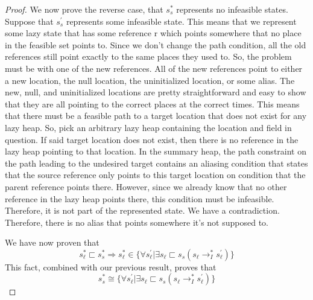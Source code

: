 \begin{proof}
We now prove the reverse case, that $s_s^*$ represents no infeasible states. Suppose that $s_s^\prime$ represents some infeasible state. This means that we represent some lazy state that has some reference r which points somewhere that no place in the feasible set points to. Since we don't change the path condition, all the old references still point exactly to the same places they used to. So, the problem must be with one of the new references. All of the new references point to either a new location, the null location, the uninitialized location, or some alias. The new, null, and uninitialized locations are pretty straightforward and easy to show that they are all pointing to the correct places at the correct times. This means that there must be a feasible path to a target location that does not exist for any lazy heap. So, pick an arbitrary lazy heap containing the location and field in question. If said target location does not exist, then there is no reference in the lazy heap pointing to that location. In the summary heap, the path constraint on the path leading to the undesired target contains an aliasing condition that states that the source reference only points to this target location on condition that the parent reference points there. However, since we already know that no other reference in the lazy heap points there, this condition must be infeasible. Therefore, it is not part of the represented state. We have a contradiction. Therefore, there is no alias that points somewhere it's not supposed to.

We have now proven that 
$$ s_\ell^* \sqsubset s_s^*  \Rightarrow  s_\ell^* \in \{\forall s_\ell^\prime | \exists s_\ell \sqsubset s_s (s_\ell \rightarrow_I^* s_\ell^\prime)  \}$$
This fact, combined with our previous result, proves that
$$s_s^*  \cong \{\forall s_\ell^\prime | \exists s_\ell \sqsubset s_s (s_\ell \rightarrow_I^* s_\ell^\prime)  \}$$

\end{proof}

